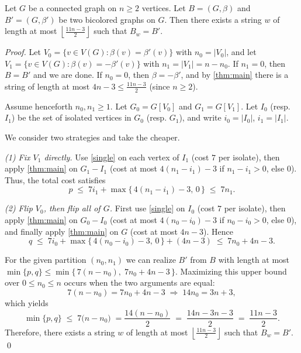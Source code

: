 \documentclass[runningheads,orivec]{llncs}
\begin{document}
\begin{theorem}
    \label{transform}
    Let $G$ be a connected graph on $n \geq 2$ vertices. 
    Let $B = (G, \beta)$ and $B' = (G, \beta')$ be two bicolored graphs on $G$. 
    Then there exists a string $w$ of length at most $ \left \lfloor \tfrac{11n-3}{2}\right \rfloor$ such that $B_w = B'$.
\end{theorem}
\begin{proof}
    Let $V_0 = \{v \in V(G) : \beta(v) = \beta'(v)\}$ with $n_0 = |V_0|$, and 
    let $V_1 = \{v \in V(G) : \beta(v) = -\beta'(v)\}$ with $n_1 = |V_1| = n - n_0$.
    If $n_1 = 0$, then $B = B'$ and we are done.
    If $n_0 = 0$, then $\beta = -\beta'$, and by \autoref{thm:main} there is a string of length at most $4n-3 \leq \frac{11n-3}{2}$ (since $n \ge 2$).

    Assume henceforth $n_0, n_1 \ge 1$.
    Let $G_0 = G[V_0]$ and $G_1 = G[V_1]$.
    Let $I_0$ (resp. $I_1$) be the set of isolated vertices in $G_0$ (resp. $G_1$), and write $i_0 = |I_0|$, $i_1 = |I_1|$.

    We consider two strategies and take the cheaper.

    \smallskip\noindent\emph{(1) Fix $V_1$ directly.}
    Use \autoref{single} on each vertex of $I_1$ (cost $7$ per isolate), then apply \autoref{thm:main} on $G_1 - I_1$ (cost at most $4(n_1 - i_1) - 3$ if $n_1 - i_1 > 0$, else $0$).
    Thus, the total cost satisfies
    \[
        p \;\le\; 7 i_1 + \max\{\,4(n_1 - i_1) - 3,\,0\,\} \;\le\; 7 n_1.
    \]

    \smallskip\noindent\emph{(2) Flip $V_0$, then flip all of $G$.}
    First use \autoref{single} on $I_0$ (cost $7$ per isolate), then apply \autoref{thm:main} on $G_0 - I_0$ (cost at most $4(n_0 - i_0) - 3$ if $n_0 - i_0 > 0$, else $0$), and finally apply \autoref{thm:main} on $G$ (cost at most $4n - 3$). 
    Hence
    \[
        q \;\le\; 7 i_0 + \max\{\,4(n_0 - i_0) - 3,\,0\,\} + (4n - 3) \;\le\; 7 n_0 + 4n - 3.
    \]

    For the given partition $(n_0,n_1)$ we can realize $B'$ from $B$ with length at most $\min\{p,q\} \le \min\{\,7(n-n_0),\; 7n_0 + 4n - 3\,\}$.
    Maximizing this upper bound over $0 \le n_0 \le n$ occurs when the two arguments are equal:
    \[
        7(n - n_0) = 7n_0 + 4n - 3 
        \;\Longrightarrow\;
        14n_0 =3n+3,
    \]
    which yields
    \[
        \min\{p,q\} \;\le\; 7\bigl(n - n_0\bigr)\;=\frac{14(n-n_0)}{2}\;=\;\frac{14n-3n-3}{2}
        \;= \;  \frac{11n - 3}{2} .
    \]
    Therefore, there exists a string $w$ of length at most $ \left \lfloor \tfrac{11n-3}{2}\right \rfloor$ such that $B_w = B'$.
    \qed
\end{proof}
\end{document}
